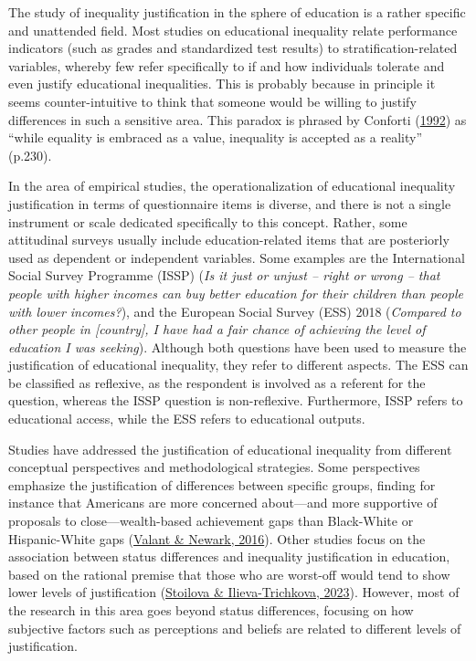 \documentclass[
  12pt,
  a4paper,
]{article}
\begin{document}
The study of inequality justification in the sphere of education is a
rather specific and unattended field. Most studies on educational
inequality relate performance indicators (such as grades and
standardized test results) to stratification-related variables, whereby
few refer specifically to if and how individuals tolerate and even
justify educational inequalities. This is probably because in principle
it seems counter-intuitive to think that someone would be willing to
justify differences in such a sensitive area. This paradox is phrased by
Conforti
(\protect\hyperlink{ref-confortiLegitimationInequalityAmerican1992}{1992})
as ``while equality is embraced as a value, inequality is accepted as a
reality'' (p.230).

In the area of empirical studies, the operationalization of educational
inequality justification in terms of questionnaire items is diverse, and
there is not a single instrument or scale dedicated specifically to this
concept. Rather, some attitudinal surveys usually include
education-related items that are posteriorly used as dependent or
independent variables. Some examples are the International Social Survey
Programme (ISSP) (\emph{Is it just or unjust -- right or wrong -- that
people with higher incomes can buy better education for their children
than people with lower incomes?}), and the European Social Survey (ESS)
2018 (\emph{Compared to other people in {[}country{]}, I have had a fair
chance of achieving the level of education I was seeking}). Although
both questions have been used to measure the justification of
educational inequality, they refer to different aspects. The ESS can be
classified as reflexive, as the respondent is involved as a referent for
the question, whereas the ISSP question is non-reflexive. Furthermore,
ISSP refers to educational access, while the ESS refers to educational
outputs.

Studies have addressed the justification of educational inequality from
different conceptual perspectives and methodological strategies. Some
perspectives emphasize the justification of differences between specific
groups, finding for instance that Americans are more concerned
about---and more supportive of proposals to close---wealth-based
achievement gaps than Black-White or Hispanic-White gaps
(\protect\hyperlink{ref-valantPoliticsAchievementGaps2016}{Valant \&
Newark, 2016}). Other studies focus on the association between status
differences and inequality justification in education, based on the
rational premise that those who are worst-off would tend to show lower
levels of justification
(\protect\hyperlink{ref-stoilovaFairnessEducationalOpportunities2023}{Stoilova
\& Ilieva-Trichkova, 2023}). However, most of the research in this area
goes beyond status differences, focusing on how subjective factors such
as perceptions and beliefs are related to different levels of
justification.
\end{document}
